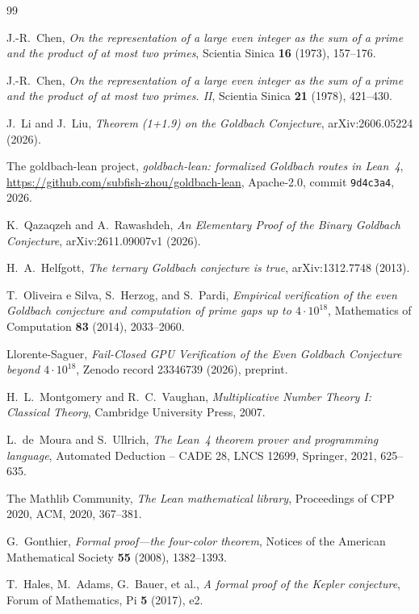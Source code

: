 \documentclass[11pt,a4paper]{article}
\theoremstyle{plain}
\theoremstyle{definition}
\begin{document}
\begin{thebibliography}{99}

J.-R.~Chen,
\emph{On the representation of a large even integer as the sum of a prime and the product of at most two primes},
Scientia Sinica \textbf{16} (1973), 157--176.

J.-R.~Chen,
\emph{On the representation of a large even integer as the sum of a prime and the product of at most two primes. II},
Scientia Sinica \textbf{21} (1978), 421--430.

J.~Li and J.~Liu,
\emph{Theorem (1+1.9) on the Goldbach Conjecture},
arXiv:2606.05224 (2026).

The goldbach-lean project,
\emph{goldbach-lean: formalized Goldbach routes in Lean~4},
\url{https://github.com/subfish-zhou/goldbach-lean}, Apache-2.0, commit \texttt{9d4c3a4}, 2026.

K.~Qazaqzeh and A.~Rawashdeh,
\emph{An Elementary Proof of the Binary Goldbach Conjecture},
arXiv:2611.09007v1 (2026).

H.~A.~Helfgott,
\emph{The ternary Goldbach conjecture is true},
arXiv:1312.7748 (2013).

T.~Oliveira e Silva, S.~Herzog, and S.~Pardi,
\emph{Empirical verification of the even Goldbach conjecture and computation of prime gaps up to $4\cdot10^{18}$},
Mathematics of Computation \textbf{83} (2014), 2033--2060.

Llorente-Saguer,
\emph{Fail-Closed GPU Verification of the Even Goldbach Conjecture beyond $4\cdot10^{18}$},
Zenodo record 23346739 (2026), preprint.

H.~L.~Montgomery and R.~C.~Vaughan,
\emph{Multiplicative Number Theory I: Classical Theory},
Cambridge University Press, 2007.

L.~de~Moura and S.~Ullrich,
\emph{The Lean~4 theorem prover and programming language},
Automated Deduction -- CADE 28, LNCS 12699, Springer, 2021, 625--635.

The Mathlib Community,
\emph{The Lean mathematical library},
Proceedings of CPP 2020, ACM, 2020, 367--381.

G.~Gonthier,
\emph{Formal proof---the four-color theorem},
Notices of the American Mathematical Society \textbf{55} (2008), 1382--1393.

T.~Hales, M.~Adams, G.~Bauer, et al.,
\emph{A formal proof of the Kepler conjecture},
Forum of Mathematics, Pi \textbf{5} (2017), e2.


\end{thebibliography}
\end{document}
